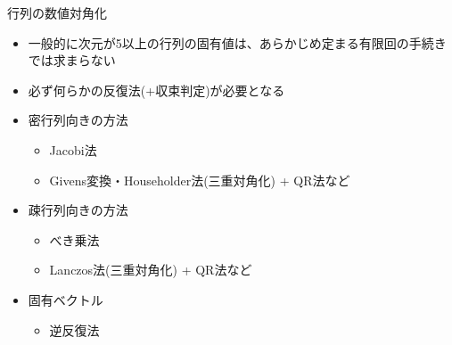 \begin{frame}[t,fragile]{行列の数値対角化}
  \begin{itemize}
  \item 一般的に次元が5以上の行列の固有値は、あらかじめ定まる有限回の手続きでは求まらない
  \item 必ず何らかの反復法(+収束判定)が必要となる
  \item 密行列向きの方法
    \begin{itemize}
    \item Jacobi法
    \item Givens変換・Householder法(三重対角化) + QR法など
    \end{itemize}
  \item 疎行列向きの方法
    \begin{itemize}
    \item べき乗法
    \item Lanczos法(三重対角化) + QR法など
    \end{itemize}
  \item 固有ベクトル
    \begin{itemize}
    \item 逆反復法
    \end{itemize}
  \end{itemize}
\end{frame}
